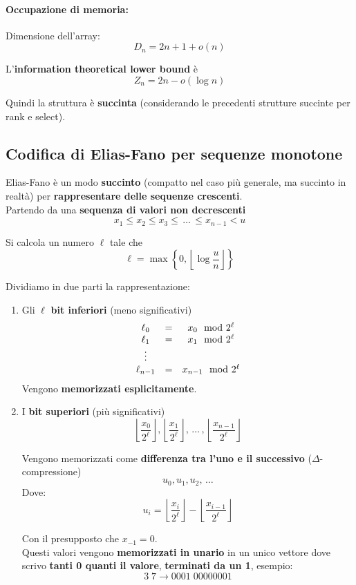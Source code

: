 \paragraph{Occupazione di memoria:} Dimensione dell'array: 
$$D_n = 2n + 1 + o(n)$$

L'\textbf{information theoretical lower bound} è 
$$ Z_n = 2n - o (\log n)$$

Quindi la struttura è \textbf{succinta} (considerando le precedenti strutture succinte per rank e select).\\

\newpage

\subsection{Codifica di Elias-Fano per sequenze monotone}
Elias-Fano è un modo \textbf{succinto} (compatto nel caso più generale, ma succinto in realtà) per \textbf{rappresentare delle sequenze crescenti}.\\

Partendo da una \textbf{sequenza di valori non decrescenti}
$$ x_1 \leq x_2 \leq x_3 \leq \, \dots \, \leq x_{n-1} < u $$

Si calcola un numero $\ell$ tale che
$$ \ell = \max \left\{0, \left\lfloor \log \frac{u}{n} \right\rfloor\right\} $$

Dividiamo in due parti la rappresentazione:
\begin{enumerate}
	\item Gli $\ell$ \textbf{bit inferiori} (meno significativi)
	$$ 
	\begin{array}{c c c}
		\ell_0 & = & x_0 \mod 2^\ell \\
		\ell_1 & = & x_1 \mod 2^\ell \\
		\vdots && \\
		\ell_{n-1} & = & x_{n-1} \mod 2^\ell \\
	\end{array}
	$$
	Vengono \textbf{memorizzati esplicitamente}.\\
	
	\item I \textbf{bit superiori} (più significativi)
	$$ \left\lfloor \frac{x_0}{2^\ell} \right\rfloor, \left\lfloor \frac{x_1}{2^\ell} \right\rfloor, \, \dots \, , \left\lfloor \frac{x_{n-1}}{2^\ell} \right\rfloor $$
	
	Vengono memorizzati come \textbf{differenza tra l'uno e il successivo} ($\Delta$-compressione)
	$$ u_0, u_1, u_2, \, \dots $$
	Dove: 
	$$ u_i = \left\lfloor \frac{x_i}{2^\ell} \right\rfloor - \left\lfloor \frac{x_{i-1}}{2^\ell} \right\rfloor$$
	
	Con il presupposto che $x_{-1} =0$.\\
	Questi valori vengono \textbf{memorizzati in unario} in un unico vettore dove scrivo \textbf{tanti 0 quanti il valore}, \textbf{terminati da un 1}, esempio:
	$$ 3\; 7 \rightarrow 0001 \; 00000001 $$
\end{enumerate}

